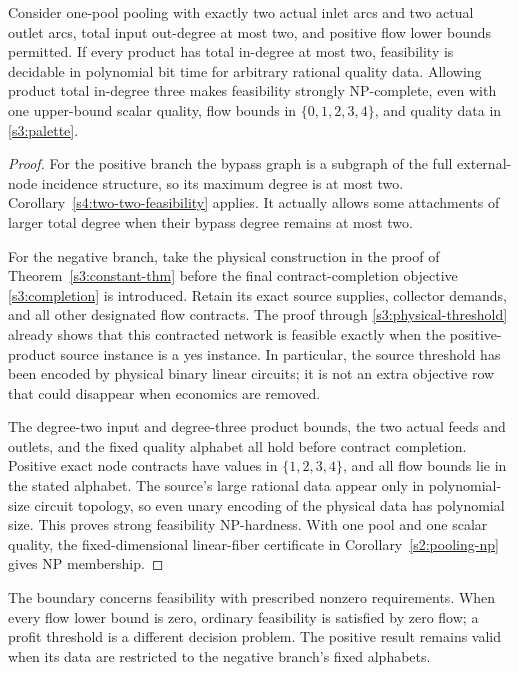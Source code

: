 \begin{corollary}
\label{s4:degree-boundary}
Consider one-pool pooling with exactly two actual inlet arcs and two
actual outlet arcs, total input out-degree at most two, and positive
flow lower bounds permitted. If every product has total in-degree at
most two, feasibility is decidable in polynomial bit time for arbitrary
rational quality data. Allowing product total in-degree three makes
feasibility strongly NP-complete, even with one upper-bound scalar
quality, flow bounds in $\{0,1,2,3,4\}$, and quality data in
\eqref{s3:palette}.
\end{corollary}
\begin{proof}
For the positive branch the bypass graph is a subgraph of the full
external-node incidence structure, so its maximum degree is at most
two. Corollary~\ref{s4:two-two-feasibility} applies. It actually allows
some attachments of larger total degree when their bypass degree
remains at most two.

For the negative branch, take the physical construction in the proof
of Theorem~\ref{s3:constant-thm} before the final contract-completion
objective \eqref{s3:completion} is introduced. Retain its exact source
supplies, collector demands, and all other designated flow contracts.
The proof through \eqref{s3:physical-threshold} already shows that this
contracted network is feasible exactly when the positive-product source
instance is a yes instance. In particular, the source threshold has
been encoded by physical binary linear circuits; it is not an extra
objective row that could disappear when economics are removed.

The degree-two input and degree-three product bounds, the two actual
feeds and outlets, and the fixed quality alphabet all hold before
contract completion. Positive exact node contracts have values in
$\{1,2,3,4\}$, and all flow bounds lie in the stated alphabet.
The source's large rational data appear only in polynomial-size
circuit topology, so even unary encoding of the physical data has
polynomial size. This proves strong feasibility NP-hardness. With
one pool and one scalar quality, the fixed-dimensional linear-fiber
certificate in Corollary~\ref{s2:pooling-np} gives NP membership.
\end{proof}

The boundary concerns feasibility with prescribed nonzero requirements.
When every flow lower bound is zero, ordinary feasibility is satisfied
by zero flow; a profit threshold is a different decision problem.
The positive result remains valid when its data are restricted to the
negative branch's fixed alphabets.

